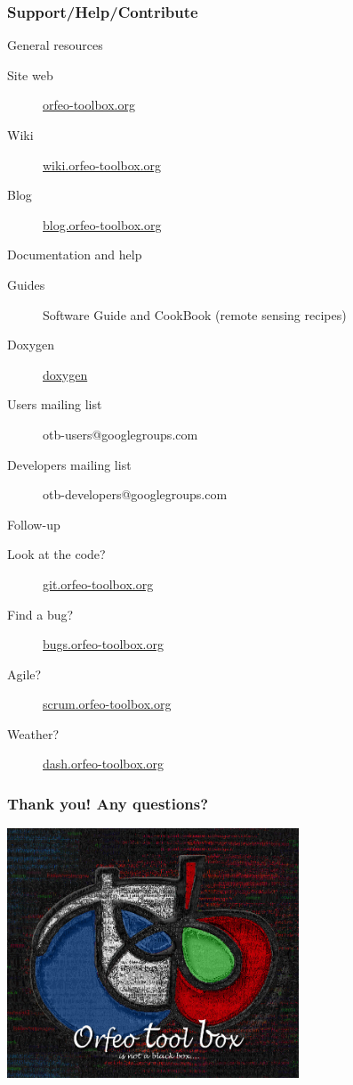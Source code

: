 \documentclass[8pt]{beamer}
\begin{document}
\begin{frame}
\frametitle{Support/Help/Contribute}
\vspace{-0.2cm}
\begin{block}{General resources}
\vspace{-0.2cm}
\begin{description}
\item[Site web] \href{http://www.orfeo-toolbox.org}{orfeo-toolbox.org}
\item[Wiki] \href{http://wiki.orfeo-toolbox.org}{wiki.orfeo-toolbox.org}
\item[Blog] \href{http://blog.orfeo-toolbox.org}{blog.orfeo-toolbox.org}
\end{description}
\end{block}
\vspace{-0.2cm}
\begin{block}{Documentation and help}
\vspace{-0.2cm}
\begin{description}
\item[Guides] Software Guide and CookBook (remote sensing recipes)
\item[Doxygen] \href{http://www.orfeo-toolbox.org/doxygen}{doxygen}
\item[Users mailing list] otb-users@googlegroups.com
\item[Developers mailing list] otb-developers@googlegroups.com
\end{description}
\end{block}
\vspace{-0.2cm}
\begin{block}{Follow-up}
\vspace{-0.2cm}
\begin{description}
\item[Look at the code?] \href{http://git.orfeo-toolbox.org}{git.orfeo-toolbox.org}
\item[Find a bug?] \href{http://bugs.orfeo-toolbox.org}{bugs.orfeo-toolbox.org}
\item[Agile?] \href{http://scrum.orfeo-toolbox.org}{scrum.orfeo-toolbox.org}
\item[Weather?] \href{http://dash.orfeo-toolbox.org}{dash.orfeo-toolbox.org}
\end{description}
\end{block}
\end{frame}


\begin{frame}
\frametitle{Thank you! Any questions?}
\begin{minipage}[t][6cm][t]{\textwidth}
\begin{center}
\includegraphics[width=0.65\textwidth]{images/LOGOTB_blackbox.png}
\end{center}
\end{minipage}
\end{frame}
\end{document}
